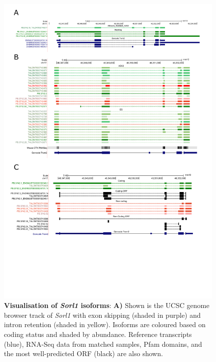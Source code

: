 \begin{landscape}
	\begin{figure}[htp]
		\begin{center}
			\includegraphics[page=11,trim={0 11cm 0 0},scale = 0.85]{Figures/pdfjoiner.pdf}
		\end{center}
		\captionsetup{width=1.5\textwidth}
		\caption[Visualisation of \textit{Sorl1} isoforms]%
		{\textbf{Visualisation of \textit{Sorl1} isoforms}: \textbf{A)} Shown is the UCSC genome browser track of \textit{Sorl1} with exon skipping (shaded in purple) and intron retention (shaded in yellow). Isoforms are coloured based on coding status and shaded by abundance. Reference transcripts (blue), RNA-Seq data from matched samples, Pfam domains, and the most well-predicted ORF (black) are also shown.}   
		\label{fig:sorl1_track1}
	\end{figure}
\end{landscape}

